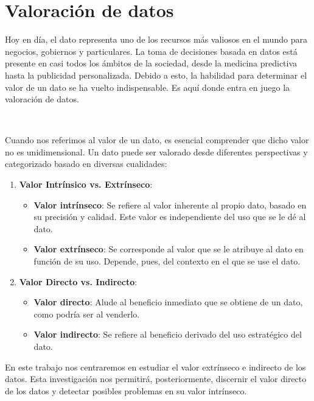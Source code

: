 \newpage
\section{Valoración de datos}

Hoy en día, el dato representa uno de los recursos más
valiosos en el mundo para negocios, gobiernos y particulares.
La toma de decisiones basada en datos está presente en
casi todos los ámbitos de la sociedad, desde la medicina
predictiva hasta la publicidad personalizada. Debido a
esto, la habilidad para determinar el valor de un dato
se ha vuelto indispensable. Es aquí donde entra
en juego la valoración de datos.

\

Cuando nos referimos al valor de un dato, es esencial
comprender que dicho valor no es unidimensional. Un dato
puede ser valorado desde diferentes perspectivas y
categorizado basado en diversas cualidades:

\begin{enumerate}
  \item \textbf{Valor Intrínsico vs. Extrínseco}:
  \begin{itemize}
    \item \textbf{Valor intrínseco}: Se refiere al valor
    inherente al propio dato, basado en su precisión y calidad.
    Este valor es independiente del uso que se le dé al dato.

    \item \textbf{Valor extrínseco}: Se corresponde al valor
    que se le atribuye al dato en función de su uso.
    Depende, pues, del contexto en el que se use el dato.
  \end{itemize}

  \item \textbf{Valor Directo vs. Indirecto}:
  \begin{itemize}
    \item \textbf{Valor directo}: Alude al beneficio
    inmediato que se obtiene de un dato, como podría ser
    al venderlo.

    \item \textbf{Valor indirecto}: Se refiere al
    beneficio derivado del uso estratégico del dato.
  \end{itemize}
\end{enumerate}

En este trabajo nos centraremos en estudiar el valor extrínseco
e indirecto de los datos. Esta investigación nos permitirá,
posteriormente, discernir el valor directo de los datos y
detectar posibles problemas en su valor intrínseco.

